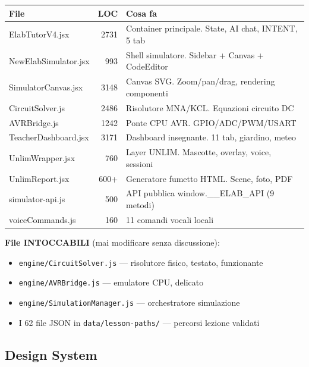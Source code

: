 \documentclass[11pt,a4paper]{article}
\begin{document}
\begin{tabularx}{\textwidth}{lrX}
\toprule
\textbf{File} & \textbf{LOC} & \textbf{Cosa fa} \\
\midrule
ElabTutorV4.jsx & 2731 & Container principale. State, AI chat, INTENT, 5 tab \\
NewElabSimulator.jsx & 993 & Shell simulatore. Sidebar + Canvas + CodeEditor \\
SimulatorCanvas.jsx & 3148 & Canvas SVG. Zoom/pan/drag, rendering componenti \\
CircuitSolver.js & 2486 & Risolutore MNA/KCL. Equazioni circuito DC \\
AVRBridge.js & 1242 & Ponte CPU AVR. GPIO/ADC/PWM/USART \\
TeacherDashboard.jsx & 3171 & Dashboard insegnante. 11 tab, giardino, meteo \\
UnlimWrapper.jsx & 760 & Layer UNLIM. Mascotte, overlay, voice, sessioni \\
UnlimReport.jsx & 600+ & Generatore fumetto HTML. Scene, foto, PDF \\
simulator-api.js & ~500 & API pubblica window.\_\_ELAB\_API (9 metodi) \\
voiceCommands.js & ~160 & 11 comandi vocali locali \\
\bottomrule
\end{tabularx}

\begin{attenzione}
\textbf{File INTOCCABILI} (mai modificare senza discussione):
\begin{itemize}[leftmargin=1.5em]
  \item \texttt{engine/CircuitSolver.js} --- risolutore fisico, testato, funzionante
  \item \texttt{engine/AVRBridge.js} --- emulatore CPU, delicato
  \item \texttt{engine/SimulationManager.js} --- orchestratore simulazione
  \item I 62 file JSON in \texttt{data/lesson-paths/} --- percorsi lezione validati
\end{itemize}
\end{attenzione}

\subsection{Design System}
\end{document}
